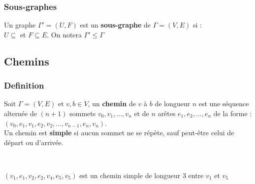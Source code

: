 \documentclass[11pt]{article}
\begin{document}
		\subsubsection{Sous-graphes}
			Un graphe $\Gamma ' = (U,F)$ est un \textbf{sous-graphe} de $\Gamma = (V,E)$ si : \\
			$U\subseteq$ et $F \subseteq E$. On notera $\Gamma ' \leq \Gamma$
	
	\subsection{Chemins}
		\subsubsection{Definition}
			Soit $\Gamma=(V,E)$ et $v,b \in V$, un \textbf{chemin} de $v$ à $b$ de longueur $n$ est une séquence alternée de $(n+1)$ sommets $v_0,v_1,...,v_n$ et de $n$ arêtes $e_1,e_2,...,e_n$ de la forme : $(v_0,e_1,v_1,e_2,v_2,...,v_{n-1},e_n,v_n)$.\\
			
			Un chemin est \textbf{simple} si aucun sommet ne se répète, sauf peut-être celui de départ ou d'arrivée.\\
			
			\begin{minipage}{0.5\textwidth}
			\centering
			 \\
			\end{minipage}\hfill
			\begin{minipage}{0.5\textwidth}
			\center
			$(v_1,e_1,v_2,e_2,v_4,e_5,v_5)$ est un chemin simple de longueur 3 entre $v_1$ et $v_5$
			\end{minipage}\\
			
\end{document}

